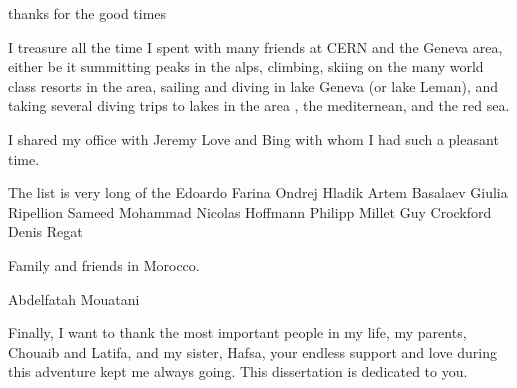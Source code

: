 thanks for the good times 

I treasure all the time I spent with many friends at CERN and the Geneva area,
either be it summitting peaks in the alps, climbing, skiing on the many world class resorts in the area, 
sailing and diving in lake Geneva (or lake Leman), and taking several diving trips to lakes in the area , 
the mediternean, and the red sea.

I shared my office with Jeremy Love and Bing with whom I had such a pleasant time. 

The list is very long of the 
Edoardo Farina
Ondrej Hladik
Artem Basalaev
Giulia Ripellion
Sameed Mohammad
Nicolas Hoffmann
Philipp Millet
Guy Crockford
Denis Regat


Family and friends in Morocco. 

Abdelfatah Mouatani

Finally, I want to thank the most important people in my life, my parents, Chouaib and Latifa, and my sister, Hafsa, 
your endless support and love during this adventure kept me always going. This dissertation is dedicated to you.

